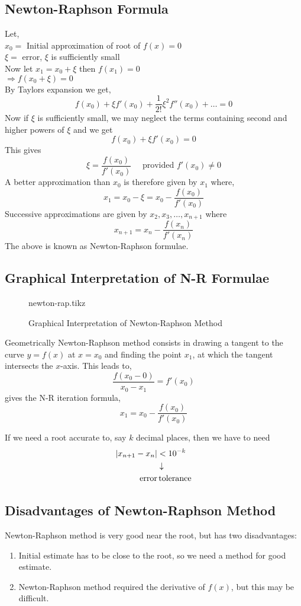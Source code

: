 \documentclass[12pt,class=book,crop=false]{standalone}
\begin{document}
\subsection{Newton-Raphson Formula}
Let,\\
\indent \( x_0= \) Initial approximation of root of \( f(x)=0 \)\\
\indent \( \xi = \) error, \( \xi \) is sufficiently small\\
Now let \( x_1=x_0+\xi  \) then \( f(x_1)=0 \)\\
\indent \( \Rightarrow f(x_0+\xi)=0 \)\\
By Taylors expansion we get,
\[
    f(x_0)+\xi f'(x_0)+\frac{1}{2!}\xi^2 f''(x_0)+\dots=0
\]
Now if \( \xi  \) is sufficiently small, we may neglect the terms containing second and higher powers of \( \xi \) and we get
\[
    f(x_0)+\xi f'(x_0)=0
\]
This gives
\[
    \xi=\frac{f(x_0)}{f'(x_0)}\quad \text{ provided } f'(x_0)\neq 0
\]
A better approximation than \( x_0 \) is therefore given by \( x_1 \) where,
\[
    x_1=x_0-\xi=x_0-\frac{f(x_0)}{f'(x_0)}
\]
Successive approximations are given by \( x_2, x_3,\dots,x_{n+1} \) where
\[
    x_{n+1}=x_n-\frac{f(x_n)}{f'(x_n)}
\]
The above is known as Newton-Raphson formulae.
\subsection{Graphical Interpretation of N-R Formulae}
\begin{figure}[H]
    \centering
    {newton-rap.tikz}
    \caption{Graphical Interpretation of Newton-Raphson Method}
\end{figure}
Geometrically Newton-Raphson method consists in drawing a tangent to the curve \( y=f(x) \) at \( x=x_0 \) and finding the point \( x_1 \), at which the tangent intersects the \( x \)-axis. This leads to,
\[
    \frac{f(x_0-0)}{x_0-x_1}=f'(x_0)
\]
gives the N-R iteration formula,
\[
    x_1=x_0-\frac{f(x_0)}{f'(x_0)}
\]
\begin{note}
    If we need a root accurate to, say \( k \) decimal places, then we have to need
    \[
        \begin{aligned}
            \left\vert x_{n+1}-x_n\right\vert & <10^{-k}           \\
                              & \downarrow         \\
            \text{error}      & \,\text{tolerance}
        \end{aligned}
    \]
\end{note}
\subsection{Disadvantages of Newton-Raphson Method}
Newton-Raphson method is very good near the root, but has two disadvantages:
\begin{enumerate}
    \item Initial estimate has to be close to the root, so we need a method for good estimate.
    \item Newton-Raphson method required the derivative of \( f(x) \), but this may be difficult.
\end{enumerate}
\end{document}
